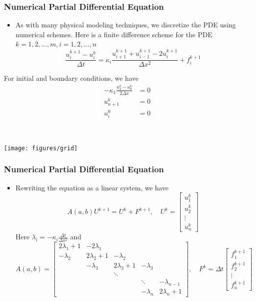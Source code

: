 \documentclass{beamer}
\begin{document}
\begin{frame}
	\frametitle{Numerical Partial Differential Equation}
	
	\begin{itemize}
		\item As with many physical modeling techniques, we discretize the PDE using numerical schemes. Here is a finite difference scheme for the PDE $k=1,2,\ldots,m, i=1,2,\ldots, n$
		$$\frac{u^{k+1}_i-u^k_i}{\Delta t} = \kappa_i \frac{u^{k+1}_{i+1}+u^{k+1}_{i-1}-2u^{k+1}_i}{\Delta x^2} + f_i^{k+1}$$
	\end{itemize}
	\begin{minipage}[c]{0.49\textwidth}
	For initial and boundary conditions, we have
		\begin{align*}
			-\kappa_1 \frac{u_2^{k}-u_0^k}{2\Delta x} &= 0\\
			u_{n+1}^k &= 0 \\
			u_i^0 &= 0
		\end{align*} 
\end{minipage}~
\begin{minipage}[c]{0.49\textwidth}
  \texttt{[image: figures/grid]}
\end{minipage}
	
		
\end{frame}

\begin{frame}
	\frametitle{Numerical Partial Differential Equation}
	
	\begin{itemize}
		\item Rewriting the equation as a linear system, we have
		$$A(a,b)U^{k+1} = U^k + F^{k+1}, \quad U^k = \begin{bmatrix}u_1^k\\u_2^k\\\vdots \\u_n^k\end{bmatrix}$$
		Here $\lambda_i = -\kappa_i \frac{\Delta t}{\Delta x^2}$ and 
		{\footnotesize
		\begin{equation*}
		A(a,b) = \begin{bmatrix}
2\lambda_1+1 & -2\lambda_1  &  & & \\
-\lambda_2 & 2\lambda_2+1 & -\lambda_2 & & \\
 & -\lambda_3 & 2\lambda_3 + 1 & -\lambda_3 & \\
& &\ddots & & \\
& & &\ddots & -\lambda_{n-1}\\
&&& -\lambda_n & 2\lambda_n+1
\end{bmatrix},\quad F^k = \Delta t \begin{bmatrix}
f_1^{k+1} \\
f_2^{k+1} \\
\vdots\\
f_n^{k+1}
\end{bmatrix}	
		\end{equation*}
		}
		
	\end{itemize}
\end{frame}
\end{document}
